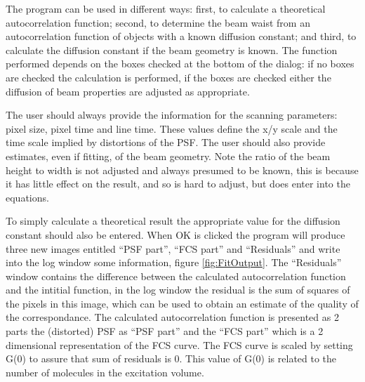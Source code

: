 \documentclass[10pt]{article}
\begin{document}
The program can be used in different ways: first, to calculate a theoretical 
autocorrelation function; second, to determine the beam waist from an
autocorrelation function of objects with a known diffusion constant; and third,
to calculate the diffusion constant if the beam geometry is known. The function
performed depends on the boxes checked at the bottom of the dialog: if no
boxes are checked the calculation is performed, if the boxes are checked either
the diffusion of beam properties are adjusted as appropriate.

The user should always provide the information for the scanning parameters: 
pixel size, pixel time and line time. These values define the x/y scale and the 
time scale implied by distortions of the PSF.
The user should also provide estimates, even if fitting, of the beam geometry. 
Note the ratio of the beam height to width is not adjusted and always presumed to
be known, this is because it has little effect on the result, and so is hard to
adjust, but does enter into the equations.

To simply calculate a theoretical result the appropriate value for the diffusion
constant should also be entered. When OK is clicked the program will produce
three new images entitled ``PSF part'', ``FCS part'' and ``Residuals'' and write
into the log window some information, figure \ref{fig:FitOutput}. The ``Residuals''
window contains the difference between the calculated autocorrelation function
and the intitial function, in the log window the residual is the sum of squares of
the pixels in this image, which can be used to obtain an estimate of the quality
of the correspondance. The calculated autocorrelation function is presented as 2
parts the (distorted) PSF as ``PSF part'' and the ``FCS part'' which is a 2
dimensional representation of the FCS curve. The FCS curve is scaled by setting G(0)
to assure that sum of residuals is 0. This value of G(0) is related to the number
of molecules in the excitation volume.
\end{document}
